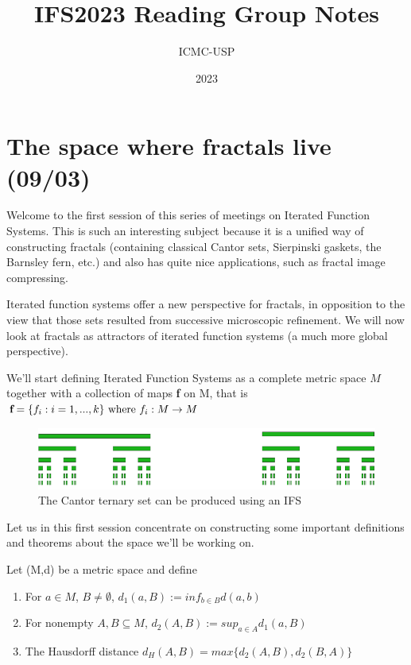 \documentclass[a4paper]{article}
\title{IFS2023 Reading Group Notes}
\author{ICMC-USP}
\date{2023}
\theoremstyle{plain}
\theoremstyle{definition}
\begin{document}
\maketitle

\tableofcontents

\section{The space where fractals live (09/03)}
Welcome to the first session of this series of meetings on Iterated Function Systems. This is such an interesting subject because it is a unified way of constructing fractals (containing classical Cantor sets, Sierpinski gaskets, the Barnsley fern, etc.) and also has quite nice applications, such as fractal image compressing.

Iterated function systems offer a new perspective for fractals, in opposition to the view that those sets resulted from successive microscopic refinement. We will now look at fractals as attractors of iterated function systems (a much more global perspective).

We'll start defining Iterated Function Systems as a complete metric space $M$ together with a collection of maps \textbf{f} on M, that is $\textbf{f} = \{f_i : i=1,...,k\} \textnormal{ where } f_i:M\rightarrow M$

\begin{figure}[H]
    \centering
    \includegraphics[scale=0.4]{img/cantor_ternary_set.png}
    \caption{The Cantor ternary set can be produced using an IFS}
    \label{fig:cantor_ternary}
\end{figure}

Let us in this first session concentrate on constructing some important definitions and theorems about the space we'll be working on.

Let (M,d) be a metric space and define
\begin{enumerate}
    \item For $a \in M$, $B \neq \emptyset$, $d_1(a,B) := inf_{b \in B} d(a,b)$
    \item For nonempty $A, B \subseteq M$, $d_2(A,B) := sup_{a \in A} d_1(a,B)$
    \item The Hausdorff distance $d_H(A,B) = max\{d_2(A,B),d_2(B,A)\}$
\end{enumerate}
\end{document}
